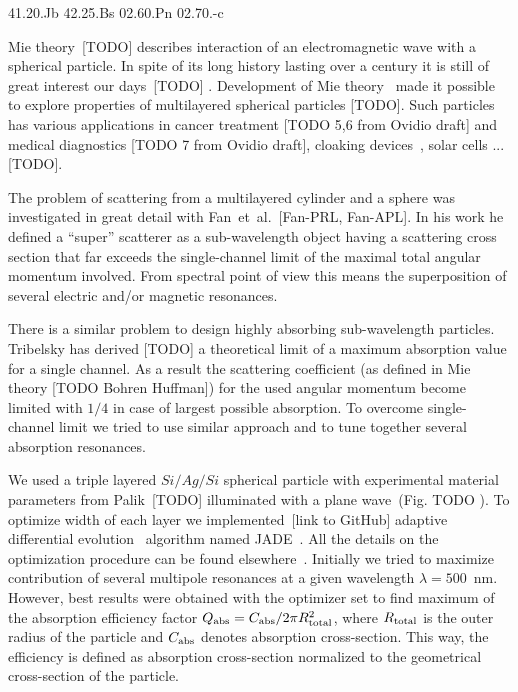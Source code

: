 \documentclass[aps,prl,twocolumn,showpacs,superscriptaddress,groupedaddress]{revtex4-1}
\begin{document}
\pacs%
{41.20.Jb 42.25.Bs 02.60.Pn 02.70.-c}

\maketitle %

Mie theory~[TODO] describes interaction of an electromagnetic wave with a
spherical particle.  In spite of its long history lasting over a
century it is still of great interest our days~[TODO] .  Development of
Mie theory~\cite{Yang-2003, Pena-scattnlay-2009} made it possible to
explore properties of multilayered spherical particles [TODO]. Such particles
has various applications in cancer treatment [TODO 5,6 from Ovidio draft]
and medical diagnostics [TODO 7 from Ovidio draft], cloaking
devices~\cite{Semouchkina-2013, Ladutenko-2014}, solar
cells ... [TODO].

The problem of scattering from a multilayered cylinder and a sphere
was investigated in great detail with Fan~et~al.~[Fan-PRL, Fan-APL].
In his work he defined a ``super'' scatterer as a sub-wavelength object
having a scattering cross section that far exceeds the single-channel
limit of the maximal total angular momentum involved.  From spectral
point of view this means the superposition of several electric and/or
magnetic resonances.

There is a similar problem to design highly absorbing sub-wavelength
particles.  Tribelsky has derived [TODO] a theoretical limit of a maximum
absorption value for a single channel.  As a result the scattering
coefficient (as defined in Mie theory [TODO Bohren Huffman]) for the used
angular momentum become limited with $1/4$ in case of largest possible
absorption. To overcome single-channel limit we tried to use similar
approach and to tune together several absorption resonances.

We used a triple layered $Si/Ag/Si$ spherical particle with
experimental material parameters from Palik~[TODO] illuminated with a
plane wave~(Fig. TODO ).  To optimize width of each layer we
implemented~[link to GitHub] adaptive differential
evolution~\cite{Storn-DE-first-1997} algorithm named
JADE~\cite{Jingqiao-JADE-2009}.  All the details on the optimization
procedure can be found elsewhere~\cite{Ladutenko-2014}.  Initially we
tried to maximize contribution of several multipole resonances at a
given wavelength $\lambda=500$~nm.  However, best results were
obtained with the optimizer set to find maximum of the absorption
efficiency factor $Q_{\rm abs}=C_{\rm abs}/2\pi R_{\rm total}^2$,
where $R_{\rm total}$ is the outer radius of the particle and $C_{\rm
  abs}$ denotes absorption cross-section. This way, the efficiency is
defined as absorption cross-section normalized to the geometrical
cross-section of the particle.
 
\end{document}

